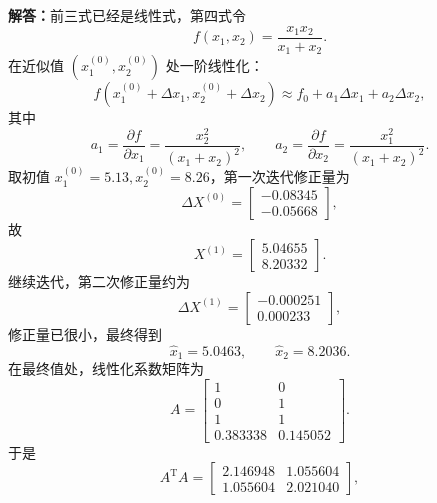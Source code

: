 \documentclass[UTF8,zihao=-4]{ctexart}
\newcommand{\jieda}{\noindent\textbf{解答：}}
\begin{document}
{\jieda 前三式已经是线性式，第四式令
\begin{equation*}
    f(x_1,x_2)=\frac{x_1x_2}{x_1+x_2}.
\end{equation*}
在近似值 $(x_1^{(0)},x_2^{(0)})$ 处一阶线性化：
\begin{equation*}
    f(x_1^{(0)}+\Delta x_1,x_2^{(0)}+\Delta x_2)
    \approx f_0+a_1\Delta x_1+a_2\Delta x_2,
\end{equation*}
其中
\begin{equation*}
    a_1=\frac{\partial f}{\partial x_1}=\frac{x_2^2}{(x_1+x_2)^2},
    \qquad
    a_2=\frac{\partial f}{\partial x_2}=\frac{x_1^2}{(x_1+x_2)^2}.
\end{equation*}
取初值 $x_1^{(0)}=5.13,x_2^{(0)}=8.26$，第一次迭代修正量为
\begin{equation*}
    \Delta X^{(0)}=\begin{bmatrix}-0.08345\\-0.05668\end{bmatrix},
\end{equation*}
故
\begin{equation*}
    X^{(1)}=\begin{bmatrix}5.04655\\8.20332\end{bmatrix}.
\end{equation*}
继续迭代，第二次修正量约为
\begin{equation*}
    \Delta X^{(1)}=\begin{bmatrix}-0.000251\\0.000233\end{bmatrix},
\end{equation*}
修正量已很小，最终得到
\begin{equation*}
    \hat{x}_1=5.0463,
    \qquad
    \hat{x}_2=8.2036.
\end{equation*}
在最终值处，线性化系数矩阵为
\begin{equation*}
    A=\begin{bmatrix}
        1&0\\
        0&1\\
        1&1\\
        0.383338&0.145052
    \end{bmatrix}.
\end{equation*}
于是
\begin{equation*}
    A^{\mathrm T}A=\begin{bmatrix}
        2.146948&1.055604\\
        1.055604&2.021040
    \end{bmatrix},

\end{equation*}}
\end{document}

